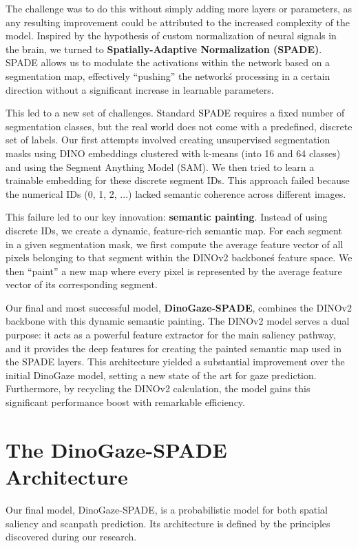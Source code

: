The challenge was to do this without simply adding more layers or parameters, as any resulting improvement could be attributed to the increased complexity of the model. Inspired by the hypothesis of custom normalization of neural signals in the brain, we turned to \textbf{Spatially-Adaptive Normalization (SPADE)}. SPADE allows us to modulate the activations within the network based on a segmentation map, effectively \enquote{pushing} the network\'s processing in a certain direction without a significant increase in learnable parameters.

This led to a new set of challenges. Standard SPADE requires a fixed number of segmentation classes, but the real world does not come with a predefined, discrete set of labels. Our first attempts involved creating unsupervised segmentation masks using DINO embeddings clustered with k-means (into 16 and 64 classes) and using the Segment Anything Model (SAM). We then tried to learn a trainable embedding for these discrete segment IDs. This approach failed because the numerical IDs (0, 1, 2, ...) lacked semantic coherence across different images.

This failure led to our key innovation: \textbf{semantic painting}. Instead of using discrete IDs, we create a dynamic, feature-rich semantic map. For each segment in a given segmentation mask, we first compute the average feature vector of all pixels belonging to that segment within the DINOv2 backbone\'s feature space. We then \enquote{paint} a new map where every pixel is represented by the average feature vector of its corresponding segment. 

Our final and most successful model, \textbf{DinoGaze-SPADE}, combines the DINOv2 backbone with this dynamic semantic painting. The DINOv2 model serves a dual purpose: it acts as a powerful feature extractor for the main saliency pathway, and it provides the deep features for creating the painted semantic map used in the SPADE layers. This architecture yielded a substantial improvement over the initial DinoGaze model, setting a new state of the art for gaze prediction. Furthermore, by recycling the DINOv2 calculation, the model gains this significant performance boost with remarkable efficiency.

\section{The DinoGaze-SPADE Architecture}
\label{sec:method_dinogaze_spade}

Our final model, DinoGaze-SPADE, is a probabilistic model for both spatial saliency and scanpath prediction. Its architecture is defined by the principles discovered during our research.

